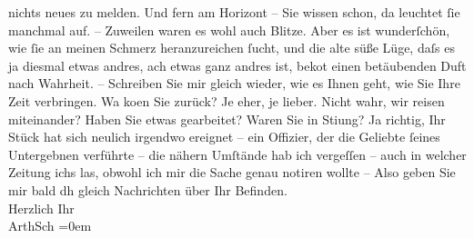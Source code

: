 \begin{ledgroupsized}[t]{13cm}
               nichts neues zu melden. Und fern am Horizont – Sie wissen schon, da leuchtet {\pb}ſie manchmal auf. – Zuweilen waren es wohl
               auch Blitze. Aber es ist wunderſchön, wie ſie an meinen Schmerz heranzureichen ſucht,
               und die alte süße Lüge, daſs es ja diesmal etwas andres, ach etwas ganz andres ist,
                  beko{\geminationm}t {\pb}einen
               betäubenden Duft nach Wahrheit. – Schreiben Sie mir gleich wieder, wie es Ihnen geht,
               wie Sie Ihre Zeit verbringen. Wa{\geminationn} ko{\geminationm}en Sie zurück? Je eher, je lieber. Nicht wahr, wir
               reisen miteinander? Haben {\pb}Sie etwas
               gearbeitet? Waren Sie in Sti{\geminationm}ung? Ja richtig, Ihr Stück hat sich neulich
               irgendwo ereignet – ein Offizier, der die Geliebte ſeines Untergebnen verführte – die
               nähern Umſtände hab ich vergeſſen – auch {\pb}in
               welcher Zeitung ichs las, obwohl ich mir die Sache genau notiren wollte – \pend
           \pstart
           Also geben Sie mir bald dh gleich Nachrichten über Ihr Befinden. {\\[\baselineskip]}Herzlich
               Ihr {\\[\baselineskip]}\spacefill\mbox{ArthSch}\pend
           \leftskip=0em{}
         
         \endnumbering{}\end{ledgroupsized}\begin{anhang}\end{anhang}\newcommand{\dateiname}{L02951}\newcommand{\titel}{Arthur Schnitzler an Felix Salten, [10.? 9. 1891]}\newcommand{\editorInnen}{Martin Anton Müller und Laura Untner}
      